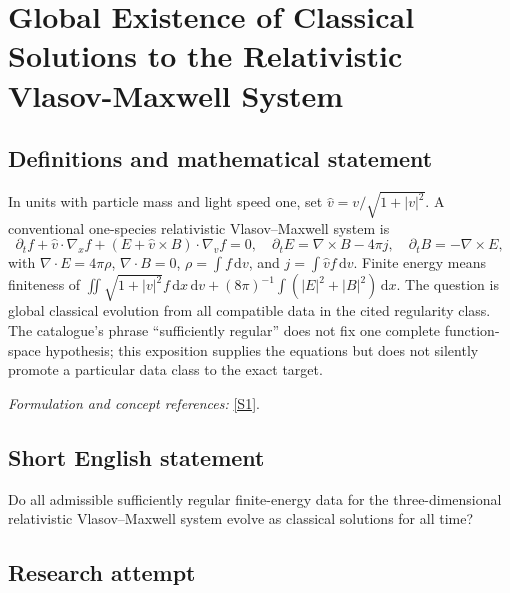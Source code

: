 \documentclass[11pt,a4paper]{article}
\newcommand{\dd}{\,\mathrm d}
\newcommand{\sref}[2]{\hyperlink{source:#1:#2}{[S#2]}}
\newif\ifshowcatalogue
\newcommand{\cataloguescope}[1]{\ifshowcatalogue
 \paragraph{Exact scope in the supplied catalogue.}
 \begin{quote}\small #1\end{quote}\fi}
\begin{document}
\setcounter{section}{213}
\clearpage
\section{\texorpdfstring{Global Existence of Classical Solutions to the Relativistic Vlasov-Maxwell System}{Global Existence of Classical Solutions to the Relativistic Vlasov-Maxwell System}}\label{214}
\subsection{Definitions and mathematical statement}
In units with particle mass and light speed one, set $\widehat v=v/\sqrt{1+|v|^2}$. A conventional one-species relativistic Vlasov--Maxwell system is
\[
 \partial_tf+\widehat v\cdot\nabla_xf+(E+\widehat v\times B)\cdot\nabla_vf=0,
 \quad \partial_tE=\nabla\times B-4\pi j,\quad\partial_tB=-\nabla\times E,
\]
with $\nabla\cdot E=4\pi\rho$, $\nabla\cdot B=0$, $\rho=\int f\dd v$, and $j=\int\widehat v f\dd v$. Finite energy means finiteness of
$\iint\sqrt{1+|v|^2}f\dd x\dd v+(8\pi)^{-1}\int(|E|^2+|B|^2)\dd x$.
The question is global classical evolution from all compatible data in the cited regularity class. The catalogue's phrase ``sufficiently regular'' does not fix one complete function-space hypothesis; this exposition supplies the equations but does not silently promote a particular data class to the exact target.
\par\smallskip\textit{Formulation and concept references:} \sref{214}{1}.
\cataloguescope{Prove or disprove that the Cauchy problem for the three-dimensional relativistic Vlasov-Maxwell system has a global classical solution (f,E,B) for every sufficiently regular finite-energy initial datum.}
\subsection{Short English statement}
Do all admissible sufficiently regular finite-energy data for the three-dimensional relativistic Vlasov–Maxwell system evolve as classical solutions for all time?
\subsection{Research attempt}
\end{document}
